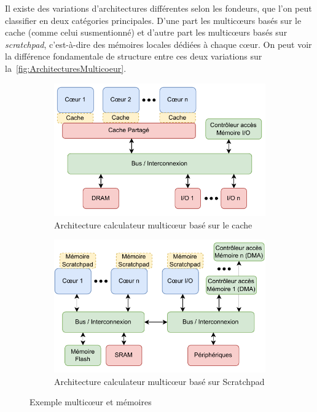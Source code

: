 \documentclass[french, a4paper, 11pt, twoside, pdftex]{StyleThese}
\begin{document}
			Il existe des variations d'architectures différentes selon les fondeurs, que l'on peut classifier en deux catégories principales. D'une part les multicœurs basés sur le cache (comme celui susmentionné) et d'autre part les multicœurs basés sur \emph{scratchpad}, c'est-à-dire des mémoires locales dédiées à chaque cœur. On peut voir la différence fondamentale de structure entre ces deux variations sur la~\autoref{fig:ArchitecturesMulticoeur}. 


\begin{figure}[ht]
	\centering
	\begin{subfigure}{.45\textwidth} \centering
		\includegraphics[width=\linewidth]{schemas/Multicore-CacheBased}
		\caption[Diagramme Multicœur Cache]{Architecture calculateur multicœur basé sur le cache}
		\label{fig:multicoeurCache}
	\end{subfigure}
	\begin{subfigure}{.45\textwidth} \centering
		\includegraphics[width=\linewidth]{schemas/Multicore-ScratchpadBased}
		\caption[Diagramme Multicœur Scratchpad]{Architecture calculateur multicœur basé sur Scratchpad}
		\label{fig:multicœurScratchpad}
	\end{subfigure}
	\caption{Exemple multicœur et mémoires}
	\label{fig:ArchitecturesMulticoeur}
\end{figure}
\end{document}
